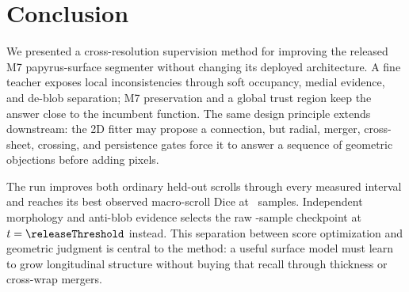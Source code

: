 \section{Conclusion}
\label{sec:conclusion}

We presented a cross-resolution supervision method for improving the released
M7 papyrus-surface segmenter without changing its deployed architecture.
A fine teacher exposes local inconsistencies through soft occupancy, medial
evidence, and de-blob separation; M7 preservation and a global trust region keep
the answer close to the incumbent function.
The same design principle extends downstream: the 2D fitter may propose a
connection, but radial, merger, cross-sheet, crossing, and persistence gates
force it to answer a sequence of geometric objections before adding pixels.

The run improves both ordinary held-out scrolls through every measured interval
and reaches its best observed macro-scroll Dice at \bestSamplesText\ samples.
Independent morphology and anti-blob evidence selects the raw
\releaseSamplesText-sample checkpoint at $t=\releaseThreshold$ instead. This
separation between score optimization and geometric judgment is central to the
method: a useful surface model must learn to grow longitudinal structure without
buying that recall through thickness or cross-wrap mergers.
